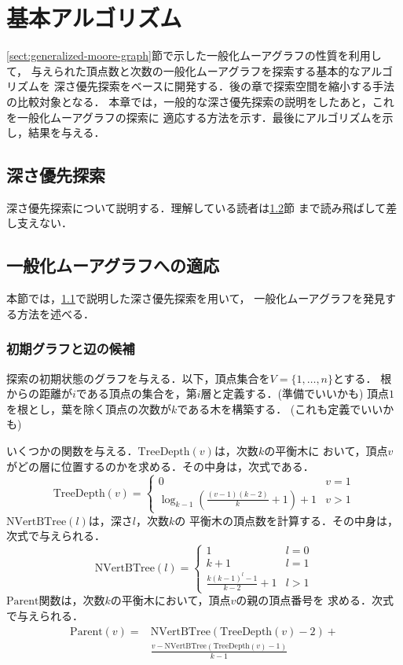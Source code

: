 
\chapter{基本アルゴリズム}
\label{chap:basic-algorithm}
\ref{sect:generalized-moore-graph}節で示した一般化ムーアグラフの性質を利用して，
与えられた頂点数と次数の一般化ムーアグラフを探索する基本的なアルゴリズムを
深さ優先探索をベースに開発する．後の章で探索空間を縮小する手法の比較対象となる．
本章では，一般的な深さ優先探索の説明をしたあと，これを一般化ムーアグラフの探索に
適応する方法を示す．最後にアルゴリズムを示し，結果を与える．

\section{深さ優先探索}
\label{sect:depth-first-search}
深さ優先探索について説明する．理解している読者は\ref{sect:apply-to-gmg}節
まで読み飛ばして差し支えない．

\section{一般化ムーアグラフへの適応}
\label{sect:apply-to-gmg}
本節では，\ref{sect:depth-first-search}で説明した深さ優先探索を用いて，
一般化ムーアグラフを発見する方法を述べる．

\subsection{初期グラフと辺の候補}
\label{subsect:initial-graph}
探索の初期状態のグラフを与える．以下，頂点集合を$V=\{1,\ldots,n\}$とする．
根からの距離が$i$である頂点の集合を，第$i$層と定義する．(準備でいいかも)
頂点$1$を根とし，葉を除く頂点の次数が$k$である木を構築する．
(これも定義でいいかも)

いくつかの関数を与える．$\mathrm{TreeDepth}(v)$は，次数$k$の平衡木に
おいて，頂点$v$がどの層に位置するのかを求める．その中身は，次式である．
\[ \mathrm{TreeDepth}(v) = \begin{cases}
  0 & v = 1 \\
  \log_{k-1}{(\frac{(v-1)(k-2)}{k}+1)} + 1 & v > 1
\end{cases} \]
$\mathrm{NVertBTree}(l)$は，深さ$l$，次数$k$の
平衡木の頂点数を計算する．その中身は，次式で与えられる．
\[ \mathrm{NVertBTree}(l) = \begin{cases}
  1 & l = 0 \\
  k + 1 & l = 1 \\
  \frac{k(k-1)^l-1}{k-2} + 1 & l > 1
\end{cases} \]
$\mathrm{Parent}$関数は，次数$k$の平衡木において，頂点$v$の親の頂点番号を
求める．次式で与えられる．
\begin{align*}
  \mathrm{Parent}(v)=&\mathrm{NVertBTree}(\mathrm{TreeDepth}(v)-2) +\\
  &\frac{v-\mathrm{NVertBTree}(\mathrm{TreeDepth}(v)-1)}{k-1}
\end{align*}

